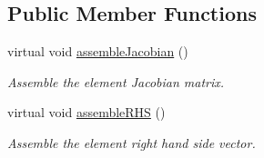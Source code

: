 \subsection*{Public Member Functions}
\begin{DoxyCompactItemize}
\item 
virtual void \hyperlink{classFEDD_1_1AssembleFEAceNavierStokes_a1535786ac6b897da287e3e7e0aa60f61}{assemble\+Jacobian} ()
\begin{DoxyCompactList}\small\item\em Assemble the element Jacobian matrix. \end{DoxyCompactList}\item 
virtual void \hyperlink{classFEDD_1_1AssembleFEAceNavierStokes_af42c6437fdac694ffbdccd12f8c581f2}{assemble\+R\+HS} ()
\begin{DoxyCompactList}\small\item\em Assemble the element right hand side vector. \end{DoxyCompactList}\end{DoxyCompactItemize}

